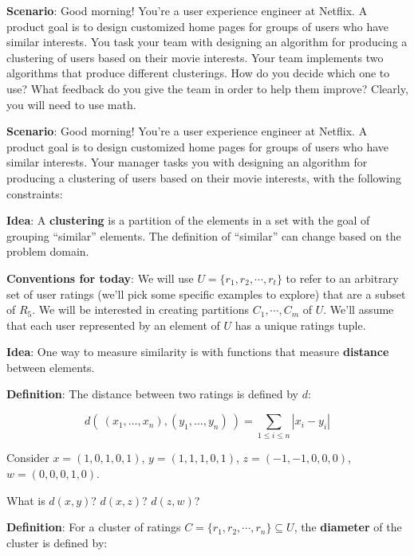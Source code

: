 
\begin{multicols}{2}
{\bf Scenario}: Good morning! You're a user experience engineer at Netflix. A
product goal is to design customized home pages for groups of users who have
similar interests. You task your team with designing an algorithm for
producing a clustering of users based on their movie interests. Your team
implements two algorithms that produce different clusterings. How do you
decide which one to use? What feedback do you give the team in order to help
them improve? Clearly, you will need to use math.

\columnbreak

{\bf Scenario}: Good morning! You're a user experience engineer at Netflix. A
product goal is to design customized home pages for groups of users who have
similar interests. Your manager tasks you with designing an algorithm for
producing a clustering of users based on their movie interests, with the following constraints:

\end{multicols}

{\bf Idea}: A {\bf clustering} is a partition of the elements in a set with the goal of grouping ``similar'' elements. The definition of ``similar'' can change based on the problem domain.


{\bf Conventions for today}: We will use $U = \{r_1, r_2, \cdots, r_t\}$ to refer to an arbitrary set of user ratings (we'll pick some specific examples to explore) that are a subset of $R_5$. We will be interested in creating partitions $C_1, \cdots, C_m$ of $U$. We'll assume that each user represented by an element of $U$ has a unique ratings tuple.

{\bf Idea}: One way to measure similarity is with functions that measure {\bf distance} between elements.

{\bf Definition}: The distance between two ratings is defined by $d$:

$$d(~ (x_1, \ldots, x_n) , (y_1, \ldots, y_n) ~) =  \displaystyle \sum_{1 \leq i \leq n} | x_i - y_i |$$

Consider $x = (1, 0, 1, 0, 1)$, $y = (1, 1, 1, 0, 1)$, $z = (-1, -1, 0, 0, 0)$, $w = (0, 0, 0, 1, 0)$.

What is $d(x, y)$? $d(x, z)$? $d(z, w)$?

\vfill

\newpage

{\bf Definition}: For a cluster of ratings $C = \{r_1, r_2, \cdots, r_n \} \subseteq U$, the {\bf diameter} of the cluster is defined by:

